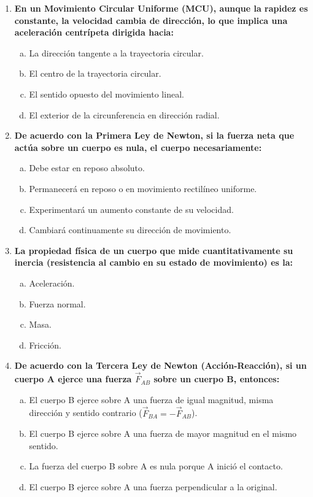 \documentclass[11pt,a4paper]{article}
\begin{document}
\begin{enumerate}
    \item \textbf{En un Movimiento Circular Uniforme (MCU), aunque la rapidez es constante, la velocidad cambia de dirección, lo que implica una aceleración centrípeta dirigida hacia:}
    \begin{enumerate}[a)]
        \item La dirección tangente a la trayectoria circular.
        \item El centro de la trayectoria circular.
        \item El sentido opuesto del movimiento lineal.
        \item El exterior de la circunferencia en dirección radial.
    \end{enumerate}

    \item \textbf{De acuerdo con la Primera Ley de Newton, si la fuerza neta que actúa sobre un cuerpo es nula, el cuerpo necesariamente:}
    \begin{enumerate}[a)]
        \item Debe estar en reposo absoluto.
        \item Permanecerá en reposo o en movimiento rectilíneo uniforme.
        \item Experimentará un aumento constante de su velocidad.
        \item Cambiará continuamente su dirección de movimiento.
    \end{enumerate}

    \item \textbf{La propiedad física de un cuerpo que mide cuantitativamente su inercia (resistencia al cambio en su estado de movimiento) es la:}
    \begin{enumerate}[a)]
        \item Aceleración.
        \item Fuerza normal.
        \item Masa.
        \item Fricción.
    \end{enumerate}

    \item \textbf{De acuerdo con la Tercera Ley de Newton (Acción-Reacción), si un cuerpo A ejerce una fuerza $\vec{F}_{AB}$ sobre un cuerpo B, entonces:}
    \begin{enumerate}[a)]
        \item El cuerpo B ejerce sobre A una fuerza de igual magnitud, misma dirección y sentido contrario ($\vec{F}_{BA} = -\vec{F}_{AB}$).
        \item El cuerpo B ejerce sobre A una fuerza de mayor magnitud en el mismo sentido.
        \item La fuerza del cuerpo B sobre A es nula porque A inició el contacto.
        \item El cuerpo B ejerce sobre A una fuerza perpendicular a la original.
    \end{enumerate}

\end{enumerate}
\end{document}
